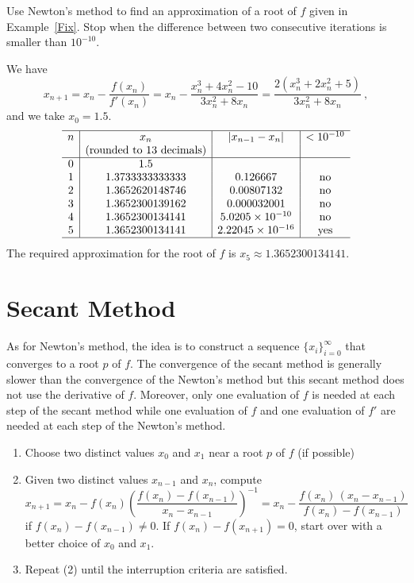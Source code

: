 \begin{egg}
Use Newton's method to find an approximation of
a root of $f$ given in Example~\ref{Fix}.  Stop when the difference
between two consecutive iterations is smaller than $10^{-10}$.

We have
\[
x_{n+1} = x_n - \frac{f(x_n)}{f'(x_n)}
= x_n - \frac{x_n^3 + 4 x_n^2 - 10}{3 x_n^2 + 8 x_n}
= \frac{2 \left( x_n^3 + 2 x_n^2 + 5\right)}{3 x_n^2 + 8 x_n} \ ,
\]
and we take $x_0 = 1.5$.
\[
\begin{array}{c|c|c|c}
\hline
n & x_n & |x_{n-1}-x_n| & < 10^{-10}\\
& \text{(rounded to 13 decimals)} & & \\
\hline
0 & 1.5 & & \\
1 & 1.3733333333333 & 0.126667 & \text{no} \\
2 & 1.3652620148746 & 0.00807132 & \text{no} \\
3 & 1.3652300139162 & 0.000032001 & \text{no} \\
4 & 1.3652300134141 & 5.0205\times 10^{-10} & \text{no} \\
5 & 1.3652300134141 & 2.22045\times 10^{-16} & \text{yes} \\
\hline
\end{array}
\]
The required approximation for the root of $f$ is
$x_5 \approx 1.3652300134141$.
\end{egg}

\section{Secant Method}

As for Newton's method, the idea is to construct a
sequence $\{x_i\}_{i=0}^\infty$ that converges to a root $p$ of
$f$.  The convergence of the secant method is generally slower than
the convergence of the Newton's method but this secant method does not
use the derivative of $f$.  Moreover, only one evaluation of $f$ is
needed at each step of the secant method while one evaluation of $f$
and one evaluation of $f'$ are needed at each step of the Newton's method.

\begin{algo}[Secant]
\begin{enumerate}
\item Choose two distinct values $x_0$ and $x_1$ near a root $p$ of
  $f$ (if possible)
\item Given two distinct values $x_{n-1}$ and $x_n$, compute
\begin{equation} \label{formula3}
x_{n+1} = x_n - f(x_n) \left(\frac{f(x_n)-f(x_{n-1})}{x_n-x_{n-1}}\right)^{-1}
= x_n - \frac{f(x_n)\,(x_n-x_{n-1})}{f(x_n)-f(x_{n-1})}
\end{equation}
if $f(x_n)-f(x_{n-1})\not=0$.  If $f(x_n)-f(x_{n+1})=0$, start over
with a better choice of $x_0$ and $x_1$.
\item Repeat (2) until the interruption criteria are satisfied.
\end{enumerate}
\end{algo}

